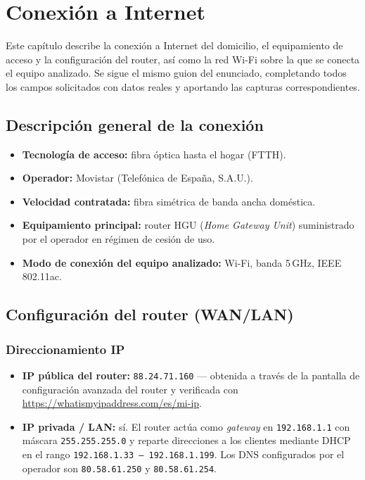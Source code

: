 \chapter{Conexión a Internet}

Este capítulo describe la conexión a Internet del domicilio, el equipamiento de acceso y la configuración del router, así como la red Wi-Fi sobre la que se conecta el equipo analizado. Se sigue el mismo guion del enunciado, completando todos los campos solicitados con datos reales y aportando las capturas correspondientes.

\section{Descripción general de la conexión}

\begin{itemize}[leftmargin=*]
    \item \textbf{Tecnología de acceso:} fibra óptica hasta el hogar (FTTH).
    \item \textbf{Operador:} Movistar (Telefónica de España, S.A.U.).
    \item \textbf{Velocidad contratada:} fibra simétrica de banda ancha doméstica.
    \item \textbf{Equipamiento principal:} router HGU (\textit{Home Gateway Unit}) suministrado por el operador en régimen de cesión de uso.
    \item \textbf{Modo de conexión del equipo analizado:} Wi-Fi, banda 5\,GHz, IEEE 802.11ac.
\end{itemize}

\section{Configuración del router (WAN/LAN)}

\subsection{Direccionamiento IP}

\begin{itemize}[leftmargin=*]
    \item \textbf{IP pública del router:} \texttt{88.24.71.160} --- obtenida a través de la pantalla de configuración avanzada del router y verificada con \url{https://whatismyipaddress.com/es/mi-ip}.
    \item \textbf{IP privada / LAN:} sí. El router actúa como \textit{gateway} en \texttt{192.168.1.1} con máscara \texttt{255.255.255.0} y reparte direcciones a los clientes mediante DHCP en el rango \texttt{192.168.1.33 -- 192.168.1.199}. Los DNS configurados por el operador son \texttt{80.58.61.250} y \texttt{80.58.61.254}.
\end{itemize}

